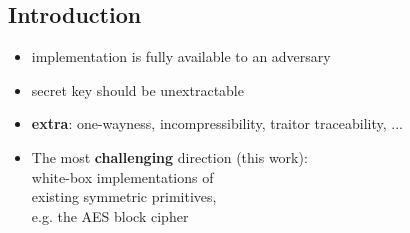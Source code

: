\subsection{Introduction}

\begin{frame}[t]

    
\end{frame}

\begin{frame}
\pause
\begin{itemize}
    \item implementation is fully \alert{available} to an adversary
    \item secret key should be \alert{unextractable}
    \item {\bf extra}: one-wayness, incompressibility, traitor traceability, ...
\end{itemize}
\vspace{1cm}
\pause
\begin{itemize}
    \item The most {\bf challenging} direction (this work): \\
          white-box implementations of \\
          \alert{existing} symmetric primitives, \\
          e.g. the AES block cipher
\end{itemize}
\end{frame}


